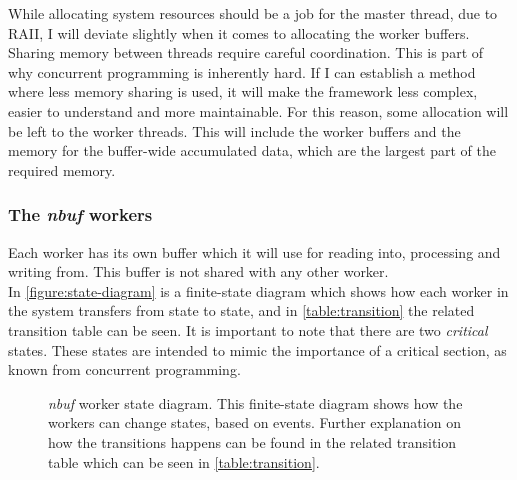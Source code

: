 \documentclass[a4paper]{article}
\newcommand{\nbuf}{\textit{nbuf} }
\begin{document}
While allocating system resources should be a job for the master thread, due to RAII, I will deviate slightly when it comes to allocating the worker buffers. Sharing memory between threads require careful coordination. This is part of why concurrent programming is inherently hard. If I can establish a method where less memory sharing is used, it will make the framework less complex, easier to understand and more maintainable. For this reason, some allocation will be left to the worker threads. This will include the worker buffers and the memory for the buffer-wide accumulated data, which are the largest part of the required memory.



\subsubsection{The \nbuf workers}

Each worker has its own buffer which it will use for reading into, processing and writing from. This buffer is not shared with any other worker.\\

In \autoref{figure:state-diagram} is a finite-state diagram which shows how each worker in the system transfers from state to state, and in \autoref{table:transition} the related transition table can be seen. It is important to note that there are two \textit{critical} states. These states are intended to mimic the importance of a critical section, as known from concurrent programming.\\

\begin{figure}
	\begin{adjustwidth}{-0.5in}{-0.5in}
    \centering
    \def\svgwidth{\columnwidth}
    
  	\caption{\nbuf worker state diagram. This finite-state diagram shows how the workers can change states, based on events. Further explanation on how the transitions happens can be found in the related transition table which can be seen in \autoref{table:transition}.}
	\label{figure:state-diagram}
	\end{adjustwidth}
\end{figure}
\end{document}
